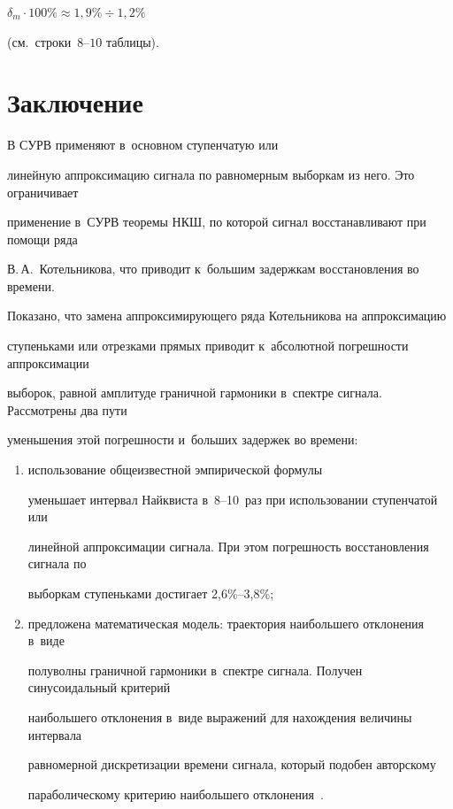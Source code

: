 $\delta_m\cdot 100\%\approx 1{,}9\%\div 1{,}2\%$ 


(см.\ строки~$8\mbox{--}10$ таблицы).


  


  \section{Заключение}


  


  В СУРВ применяют в~основном ступенчатую или 


линейную аппроксимацию сигнала по равномерным выборкам из него. Это ограничивает 


применение в~СУРВ теоремы НКШ, по которой сигнал восстанавливают при помощи ряда 


В.\,А.~Котельникова, что приводит к~большим задержкам восстановления во времени.


  


  Показано, что замена аппроксимирующего ряда Котельникова на аппроксимацию 


ступеньками или отрезками прямых приводит к~абсолютной погрешности аппроксимации 


выборок, равной амплитуде граничной гармоники в~спектре сигнала. Рассмотрены два пути 


уменьшения этой погрешности и~больших задержек во времени:


  \begin{enumerate}[(1)]


  \item  использование общеизвестной эмпирической формулы   


уменьшает интервал Найквиста в~8--10~раз при использовании ступенчатой или 


линейной аппроксимации сигнала. При этом погрешность восстановления сигнала по 


выборкам ступеньками достигает 2,6\%--3,8\%;


  \item  предложена математическая модель: траектория наибольшего отклонения в~виде 


полуволны граничной гармоники в~спектре сигнала. Получен синусоидальный критерий 


наибольшего отклонения в~виде выражений для нахождения величины интервала 


равномерной дискретизации времени сигнала, который подобен авторскому 


параболическому критерию наибольшего отклонения~\cite{14-m, 17-m}. 


  \end{enumerate}


